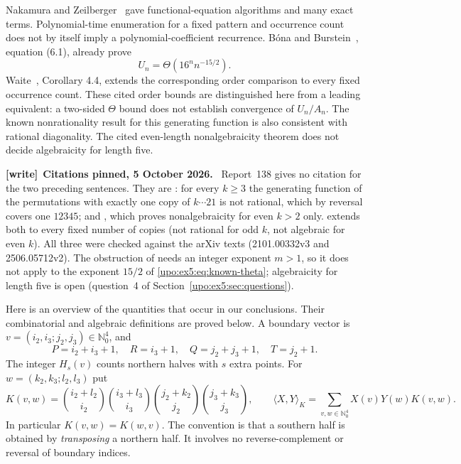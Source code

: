 \documentclass[11pt,letterpaper]{article}
\theoremstyle{remark}\newtheorem{remark}[theorem]{Remark}
\numberwithin{equation}{section}
\newcommand{\NN}{\mathbb N_0}
\newcommand{\pair}[2]{\langle #1,#2\rangle_K}
\newenvironment{writenote}[1][]{\par\smallskip\begingroup\small
 \noindent\textbf{[write]}\if\relax\detokenize{#1}\relax\else~\textbf{#1.}\fi\ }%
 {\par\endgroup\smallskip}
\begin{document}
Nakamura and Zeilberger~\cite{NZ} gave functional-equation algorithms
and many exact terms. Polynomial-time enumeration for a fixed pattern
and occurrence count does not by itself imply a polynomial-coefficient
recurrence. B\'ona and Burstein~\cite{BB}, equation (6.1), already prove
\begin{equation}\label{upo:ex5:eq:known-theta}
 U_n=\Theta(16^n n^{-15/2}).
\end{equation}
Waite~\cite{Waite}, Corollary 4.4, extends the corresponding order
comparison to every fixed occurrence count. These cited order bounds
are distinguished here from a leading equivalent: a two-sided
$\Theta$ bound does not establish convergence of $U_n/A_n$.
The known nonrationality result for this generating function is also
consistent with rational diagonality. The cited even-length
nonalgebraicity theorem does not decide algebraicity for length five.
\begin{writenote}[Citations pinned, 5 October 2026]
Report~138 gives no citation for the two preceding sentences. They are \cite[Theorem 5.3]{BB}: for every $k\ge3$ the generating function of the permutations with exactly one copy of $k\cdots21$ is not rational, which by reversal covers one $12345$; and \cite[Theorem 6.2]{BB}, which proves nonalgebraicity for even $k>2$ only. \cite[Corollary 4.4]{Waite} extends both to every fixed number of copies (not rational for odd $k$, not algebraic for even $k$). All three were checked against the arXiv texts (2101.00332v3 and 2506.05712v2). The obstruction of \cite[Lemma 6.3]{BB} needs an integer exponent $m>1$, so it does not apply to the exponent $15/2$ of \eqref{upo:ex5:eq:known-theta}; algebraicity for length five is open (question~4 of Section~\ref{upo:ex5:sec:questions}).
\end{writenote}

Here is an overview of the quantities that occur in our conclusions.
Their combinatorial and algebraic definitions are proved below.
A boundary vector is $v=(i_2,i_3;j_2,j_3)\in\NN^4$, and
\begin{equation}\label{upo:ex5:eq:Pdef}
 P=i_2+i_3+1,\quad R=i_3+1,\quad
 Q=j_2+j_3+1,\quad T=j_2+1.
\end{equation}
The integer $H_s(v)$ counts northern halves with $s$ extra points.
For $w=(k_2,k_3;l_2,l_3)$ put
\begin{equation}\label{upo:ex5:eq:kernel}
 K(v,w)=\binom{i_2+l_2}{i_2}\binom{i_3+l_3}{i_3}
         \binom{j_2+k_2}{j_2}\binom{j_3+k_3}{j_3},
 \qquad \pair XY=\sum_{v,w\in\NN^4}X(v)Y(w)K(v,w).
\end{equation}
In particular $K(v,w)=K(w,v)$. The convention is that a southern half
is obtained by \emph{transposing} a northern half. It involves no
reverse-complement or reversal of boundary indices.
\end{document}

